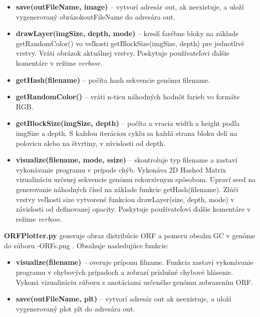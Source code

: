 \begin{itemize}
  \item \textbf{\selectfont save(outFileName, image)} -- vytvorí adresár {\selectfont out}, ak neexistuje, a uloží vygenerovaný obrázok{\selectfont outFileName} do adresára {\selectfont out}.
  \item \textbf{\selectfont drawLayer(imgSize, depth, mode)} -- kreslí farébne bloky na základe {\selectfont getRandomColor()} vo veľkosti {\selectfont getBlockSize(imgSize, depth)} pre jednotlivé vrstvy. Vráti obrázok aktuálnej vrstvy. Poskytuje používateľovi ďalšie komentáre v režime \textit{verbose}.
  \item \textbf{\selectfont getHash(filename)} -- počíta hash sekvencie genómu {\selectfont filename}.
  \item \textbf{\selectfont getRandomColor()} -- vráti n-ticu náhodných hodnôt farieb vo formáte RGB.
  \item \textbf{\selectfont getBlockSize(imgSize, depth)} -- počíta a vracia {\selectfont width} a {\selectfont height} podľa {\selectfont imgSize} a {\selectfont depth}. S každou iteráciou cyklu sa každá strana bloku delí na polovicu alebo na štvrtiny, v závislosti od {\selectfont depth}.
  \item \textbf{\selectfont visualize(filename, mode, ssize)} -- skontroluje typ {\selectfont filename} a zastaví vykonávanie programu v prípade chýb. Vykonáva 2D Hashed Matrix vizualizáciu určenej sekvencie genómu rekurzívnym spôsobom. Upraví {\selectfont seed} na generovanie náhodných čísel na základe funkcie {\selectfont getHash(filename)}. Zlúči vrstvy veľkosti {\selectfont size} vytvorené funkciou {\selectfont drawLayer(size, depth, mode)} v závislosti od definovanej {\selectfont opacity}. Poskytuje používateľovi ďalšie komentáre v režime \textit{verbose}.
\end{itemize}



\textbf{\selectfont ORFPlotter.py} generuje obraz distribúcie ORF a pomeru obsahu GC v genóme do súboru {\selectfont -ORFs.png} .
Obsahuje nasledujúce funkcie:
\begin{itemize}
  \item \textbf{\selectfont visualize(filename)} -- overuje príponu {\selectfont filname}. Funkcia zastaví vykonávanie programu v chybových prípadoch a zobrazí príslušné chybové hlásenie. Vykoná vizualizáciu súboru s anotáciami určeného genómu zobrazením ORF.
  \item \textbf{\selectfont save(outFileName, plt)} -- vytvorí adresár {\selectfont out} ak neexistuje, a uloží vygenerovaný plot {\selectfont plt} do adresára {\selectfont out}.
\end{itemize}

